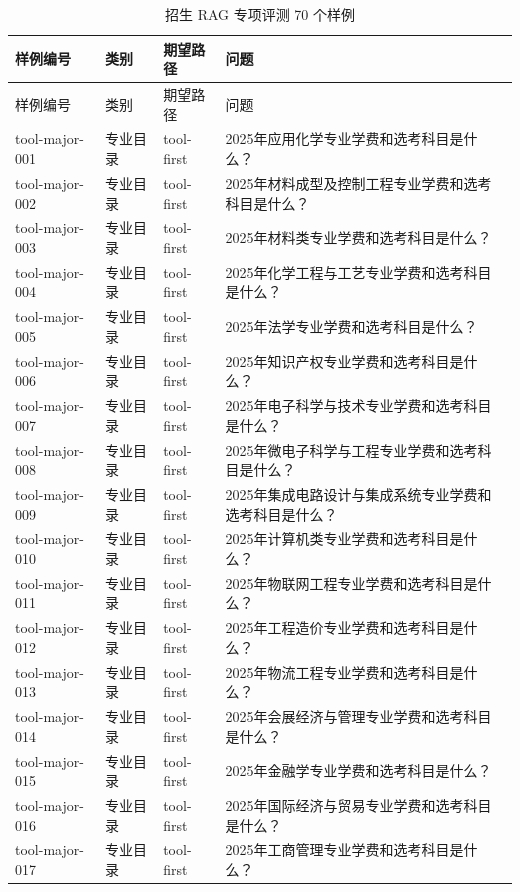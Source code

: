 \documentclass[UTF8,zihao=-4,oneside]{ctexbook}
\numberwithin{equation}{chapter}
\begin{document}
{\scriptsize
\begin{longtable}{p{}p{}p{}p{}}
  \caption{招生 RAG 专项评测 70 个样例}\\
  \toprule
  样例编号 & 类别 & 期望路径 & 问题 \\
  \midrule
  \endfirsthead
  \toprule
  样例编号 & 类别 & 期望路径 & 问题 \\
  \midrule
  \endhead
  tool-major-001 & 专业目录 & tool-first & 2025年应用化学专业学费和选考科目是什么？ \\
  tool-major-002 & 专业目录 & tool-first & 2025年材料成型及控制工程专业学费和选考科目是什么？ \\
  tool-major-003 & 专业目录 & tool-first & 2025年材料类专业学费和选考科目是什么？ \\
  tool-major-004 & 专业目录 & tool-first & 2025年化学工程与工艺专业学费和选考科目是什么？ \\
  tool-major-005 & 专业目录 & tool-first & 2025年法学专业学费和选考科目是什么？ \\
  tool-major-006 & 专业目录 & tool-first & 2025年知识产权专业学费和选考科目是什么？ \\
  tool-major-007 & 专业目录 & tool-first & 2025年电子科学与技术专业学费和选考科目是什么？ \\
  tool-major-008 & 专业目录 & tool-first & 2025年微电子科学与工程专业学费和选考科目是什么？ \\
  tool-major-009 & 专业目录 & tool-first & 2025年集成电路设计与集成系统专业学费和选考科目是什么？ \\
  tool-major-010 & 专业目录 & tool-first & 2025年计算机类专业学费和选考科目是什么？ \\
  tool-major-011 & 专业目录 & tool-first & 2025年物联网工程专业学费和选考科目是什么？ \\
  tool-major-012 & 专业目录 & tool-first & 2025年工程造价专业学费和选考科目是什么？ \\
  tool-major-013 & 专业目录 & tool-first & 2025年物流工程专业学费和选考科目是什么？ \\
  tool-major-014 & 专业目录 & tool-first & 2025年会展经济与管理专业学费和选考科目是什么？ \\
  tool-major-015 & 专业目录 & tool-first & 2025年金融学专业学费和选考科目是什么？ \\
  tool-major-016 & 专业目录 & tool-first & 2025年国际经济与贸易专业学费和选考科目是什么？ \\
  tool-major-017 & 专业目录 & tool-first & 2025年工商管理专业学费和选考科目是什么？ \\

\end{longtable}}
\end{document}
